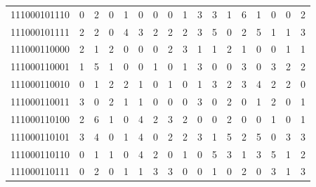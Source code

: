\documentclass[10pt,a4paper]{article}
\begin{document}
\begin{longtable}{ |c|c|c|c|c|c|c|c|c|c|c|c|c|c|c|c|c| }
    111000101110              & 0                            & 2                                & 0                            & 1                              & 0   & 0   & 0   & 1   & 3   & 3   & 1   & 6   & 1   & 0   & 0   & 2   \\
    111000101111              & 2                            & 2                                & 0                            & 4                              & 3   & 2   & 2   & 2   & 3   & 5   & 0   & 2   & 5   & 1   & 1   & 3   \\
    111000110000              & 2                            & 1                                & 2                            & 0                              & 0   & 0   & 2   & 3   & 1   & 1   & 2   & 1   & 0   & 0   & 1   & 1   \\
    111000110001              & 1                            & 5                                & 1                            & 0                              & 0   & 1   & 0   & 1   & 3   & 0   & 0   & 3   & 0   & 3   & 2   & 2   \\
    111000110010              & 0                            & 1                                & 2                            & 2                              & 1   & 0   & 1   & 0   & 1   & 3   & 2   & 3   & 4   & 2   & 2   & 0   \\
    111000110011              & 3                            & 0                                & 2                            & 1                              & 1   & 0   & 0   & 0   & 3   & 0   & 2   & 0   & 1   & 2   & 0   & 1   \\
    111000110100              & 2                            & 6                                & 1                            & 0                              & 4   & 2   & 3   & 2   & 0   & 0   & 2   & 0   & 0   & 1   & 0   & 1   \\
    111000110101              & 3                            & 4                                & 0                            & 1                              & 4   & 0   & 2   & 2   & 3   & 1   & 5   & 2   & 5   & 0   & 3   & 3   \\
    111000110110              & 0                            & 1                                & 1                            & 0                              & 4   & 2   & 0   & 1   & 0   & 5   & 3   & 1   & 3   & 5   & 1   & 2   \\
    111000110111              & 0                            & 2                                & 0                            & 1                              & 1   & 3   & 3   & 0   & 0   & 1   & 0   & 2   & 0   & 3   & 1   & 3   \\

\end{longtable}
\end{document}

